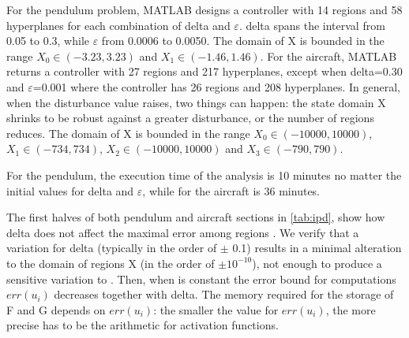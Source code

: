 For the pendulum problem, MATLAB designs a controller with 14 regions and 58 hyperplanes for each combination of delta and $\varepsilon$. delta spans the interval from 0.05 to 0.3, while $\varepsilon$ from 0.0006 to 0.0050. The domain of X is bounded in the range $X_{0} \in (-3.23, 3.23)$ and $X_{1}\in (-1.46, 1.46)$. For the aircraft, MATLAB returns a controller with 27 regions and 217 hyperplanes, except when delta=0.30 and $\varepsilon$=0.001 where the controller has 26 regions and 208 hyperplanes. In general, when the disturbance value raises, two things can happen: the state domain X shrinks to be robust against a greater disturbance, or the number of regions reduces. The domain of X is bounded in the range $X_{0} \in (-10000, 10000)$, $X_{1}\in (-734, 734)$, $X_{2}\in (-10000, 10000)$ and $X_{3}\in (-790, 790)$.

For the pendulum, the execution time of the analysis is 10 minutes no matter the initial values for delta and $\varepsilon$, while for the aircraft is 36 minutes. 

The first halves of both pendulum and aircraft sections in \autoref{tab:ipd}, show how delta does not affect the maximal error among regions \maxUij. We verify that a variation for delta (typically in the order of $\pm$ 0.1) results in a minimal alteration to the domain of regions X (in the order of $\pm 10^{-10}$), not enough to produce a sensitive variation to \maxUij. Then, when \maxUij\space is constant the error bound for computations $err(u_{i})$ decreases together with delta. The memory required for the storage of F and G depends on $err(u_{i})$: the smaller the value for $err(u_{i})$, the more precise has to be the arithmetic for activation functions. 

